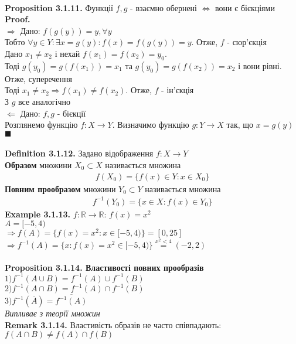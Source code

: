 \documentclass[a4paper, 14pt]{extarticle}
\def\bigline{\vspace{5mm}\\}
\def\bigline{\vspace{5mm}\\}
\def\qed{$\blacksquare$}
\begin{document}
	\\
	\textbf{Proposition 3.1.11.} 
	Функції $f,g$ - взаємно обернені $\iff$ вони є бієкціями\\
	\textbf{Proof.}\\
	$\boxed{\Rightarrow}$ Дано: $f(g(y)) = y, \forall y$\\
	Тобто $\forall y \in Y: \exists x = g(y): f(x) = f(g(y)) = y$. Отже, $f$ - сюр'єкція\\
	Дано $x_1 \neq x_2$ і нехай $f(x_1) = f(x_2) = y_0$.\\
	Тоді $g(y_0) = g(f(x_1)) = x_1$ та $g(y_0) = g(f(x_2)) = x_2$ і вони рівні. Отже, суперечення\\
	Тоді $x_1 \neq x_2 \Rightarrow f(x_1) \neq f(x_2)$. Отже, $f$ - ін'єкція\\
	З $g$ все аналогічно
	\bigline
	$\boxed{\Leftarrow}$ Дано: $f,g$ - бієкції\\
	Розглянемо функцію $f: X \to Y$. Визначимо функцію $g: Y \to X$ так, що $x = g(y)$ \qed
	\\
	\\
	\textbf{Definition 3.1.12.} Задано відображення $f: X \to Y$\\
	\textbf{Образом} множини $X_0 \subset X$ називається множина
	\begin{align*}
	f(X_0) = \{f(x) \in Y: x \in X_0 \}
	\end{align*}
	\textbf{Повним прообразом} множини $Y_0 \subset Y$ називається множина
	\begin{align*}
	f^{-1}(Y_0) = \{x \in X:  f(x) \in Y_0 \}
	\end{align*}
	\textbf{Example 3.1.13.} $f: \mathbb{R} \to \mathbb{R}$: $f(x) = x^2$\\
	$A = [-5, 4)$\\
	$\Rightarrow f(A) = \{f(x) = x^2: x \in [-5, 4) \} = [0, 25]$\\
	$\Rightarrow f^{-1}(A) = \{x: f(x) = x^2 \in [-5, 4) \} \overset{x^2 < 4}{=} (-2, 2)$\\
	\\
	\textbf{Proposition 3.1.14. Властивості повних прообразів}\\
	$1) f^{-1}(A \cup B) = f^{-1}(A) \cup f^{-1}(B)$\\
	$2) f^{-1}(A \cap B) = f^{-1}(A) \cap f^{-1}(B)$\\
	$3) f^{-1}(\overline{A}) = \overline{f^{-1}(A)}$\\
	\textit{Випливає з теорії множин}\bigline
	\textbf{Remark 3.1.14.} Властивість образів не часто співпадають:\\
	$f(A \cap B) \neq f(A) \cap f(B)$\\
	
\end{document}
